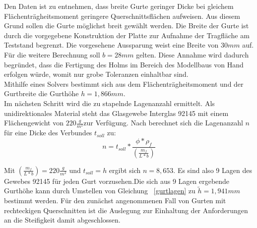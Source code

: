 \noindent Den Daten ist zu entnehmen, dass breite Gurte geringer Dicke bei gleichem Flächenträgheitsmoment geringere Querschnittsflächen aufweisen. Aus diesem Grund sollen die Gurte möglichst breit gewählt werden. Die Breite der Gurte ist durch die vorgegebene Konstruktion der Platte zur Aufnahme der Tragfläche am Teststand begrenzt. Die vorgesehene Aussparung weist eine Breite von $ 30mm $ auf. Für die weitere Berechnung soll $ b=28mm $ gelten. Diese Annahme wird dadurch begründet, dass die Fertigung des Holms im Bereich des Modellbaus von Hand erfolgen würde, womit nur grobe Toleranzen einhaltbar sind.\\

\noindent Mithilfe eines Solvers bestimmt sich aus dem Flächenträgheitsmoment und der Gurtbreite die Gurthöhe $ h=1,866mm $.\\
\noindent Im nächsten Schritt wird die zu stapelnde Lagenanzahl ermittelt. Als unidirektionales Material steht das Glasgewebe Interglas 92145 mit einem Flächengewicht von $ 220\frac{g}{m^{2}} $zur Verfügung. Nach \cite{item3} berechnet sich die Lagenanzahl $ n $ für eine Dicke des Verbundes $ t_{soll} $ zu:\\

\begin{equation}
	\label{gurtlagen}
	n=t_{soll}*\frac{\phi*\rho_{f}}{\left(\frac{m_{f}}{L*b}\right)}
\end{equation}

\noindent Mit $ \left(\frac{m_{f}}{L*b}\right) = 220\frac{g}{m^{2}} $ und $ t_{soll}=h $ ergibt sich $ n=8,653 $. Es sind also 9 Lagen des Gewebes 92145 für jeden Gurt vorzusehen.Die sich aus 9 Lagen ergebende Gurthöhe kann durch Umstellen von Gleichung ~\ref{gurtlagen} zu $ \tilde{h}=1,941mm $ bestimmt werden. Für den zunächst angenommenen Fall von Gurten mit rechteckigen Querschnitten ist die Auslegung zur Einhaltung der Anforderungen an die Steifigkeit damit abgeschlossen.\\



